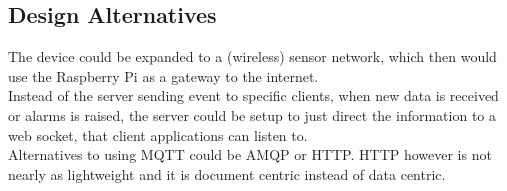 \subsection*{Design Alternatives}
The device could be expanded to a (wireless) sensor network, which then would use the Raspberry Pi as a gateway to the internet.\\
Instead of the server sending event to specific clients, when new data is received or alarms is raised, the server could be setup to just direct the information to a web socket, that client applications can listen to.\\
Alternatives to using MQTT could be AMQP or HTTP. HTTP however is not nearly as lightweight and it is document centric instead of data centric.